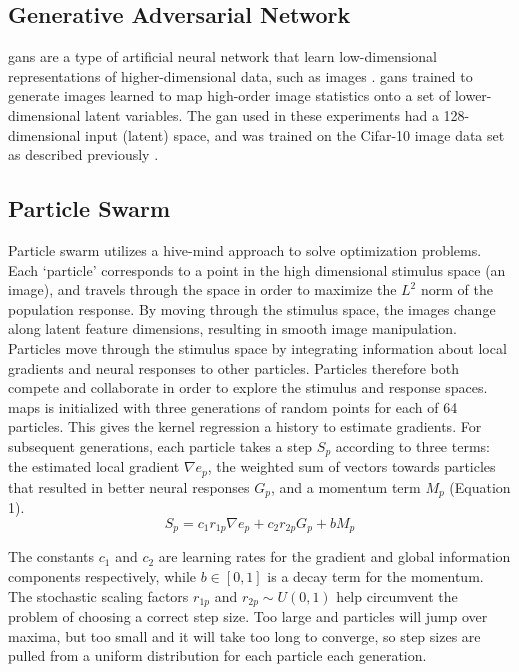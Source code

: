 \subsection*{Generative Adversarial Network}
\label{methods:gan}
\Glspl{gan} are a type of artificial neural network that learn low-dimensional representations of higher-dimensional data, such as images \cite{Karras2019}. \glspl{gan} trained to generate images learned to map high-order image statistics onto a set of lower-dimensional latent variables. The \gls{gan} used in these experiments had a 128-dimensional input (latent) space, and was trained on the Cifar-10 image data set as described previously \cite{Fruend2018}. 

\subsection{Particle Swarm}
Particle swarm utilizes a hive-mind approach to solve optimization problems. Each `particle’ corresponds to a point in the high dimensional stimulus space (an image), and travels through the space in order to maximize the $L^2$ norm of the population response. By moving through the stimulus space, the images change along latent feature dimensions, resulting in smooth image manipulation. Particles move through the stimulus space by integrating information about local gradients and neural responses to other particles. Particles therefore both compete and collaborate in order to explore the stimulus and response spaces. \\
\gls{maps} is initialized with three generations of random points for each of 64 particles. This gives the kernel regression a history to estimate gradients. For subsequent generations, each particle takes a step $S_p$ according to three terms: the estimated local gradient $\nabla e_p$,  the weighted sum of vectors towards particles that resulted in better neural responses $G_p$, and a momentum term $M_p$ (Equation 1).
\begin{equation}
	S_p= c_1 r_{1p} \nabla e_p+ c_2  r_{2p} G_p+b M_p
\end{equation}

The constants $c_1$ and $c_2$ are learning rates for the gradient and global information components respectively, while $b \in [0,1]$ is a decay term for the momentum. The stochastic scaling factors $r_{1p}$ and $r_{2p} \sim U(0,1)$ help circumvent the problem of choosing a correct step size. Too large and particles will jump over maxima, but too small and it will take too long to converge, so step sizes are pulled from a uniform distribution for each particle each generation.

